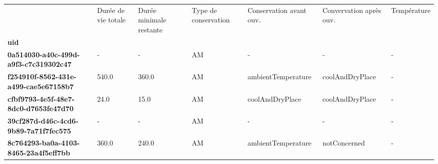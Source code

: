 \begin{tabularx}{\linewidth}{lXXXXXX}
\toprule
{} &  Durée de vie totale &  Durée minimale restante & Type de conservation & Conservation avant ouv. & Convervation après ouv. & Température \\
\textbf{uid                                 } &                      &                          &                      &                         &                         &             \\
\midrule
\textbf{0a514030-a40c-499d-a9f3-c7c319302c47} &                    - &                        - &                   AM &                       - &                       - &           - \\
\textbf{f254910f-8562-431e-a499-cae5e67158b7} &                540.0 &                    360.0 &                   AM &      ambientTemperature &         coolAndDryPlace &           - \\
\textbf{cfbf9793-4e5f-48e7-8dc0-d7653fe47d70} &                 24.0 &                     15.0 &                   AM &         coolAndDryPlace &         coolAndDryPlace &           - \\
\textbf{39cf287d-d46c-4cd6-9b89-7a71f7fec575} &                    - &                        - &                   AM &                       - &                       - &           - \\
\textbf{8c764293-ba0a-4103-8465-23a4f5eff7bb} &                360.0 &                    240.0 &                   AM &      ambientTemperature &            notConcerned &           - \\
\bottomrule
\end{tabularx}
